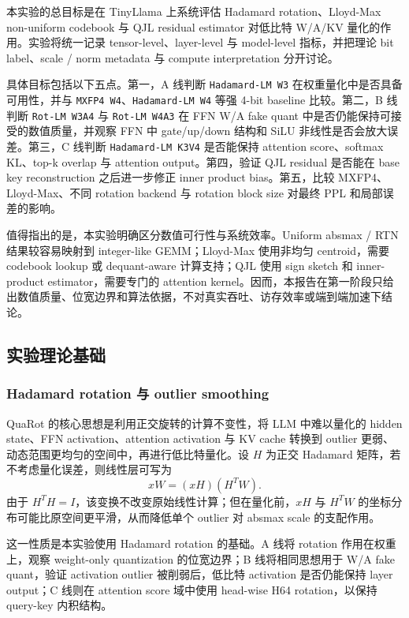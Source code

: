 \documentclass[lang=cn,chinesefont=nofont,a4paper,newtx]{elegantpaper}
\begin{document}
本实验的总目标是在 TinyLlama 上系统评估 Hadamard rotation、Lloyd-Max non-uniform codebook 与 QJL residual estimator 对低比特 W/A/KV 量化的作用。实验将统一记录 tensor-level、layer-level 与 model-level 指标，并把理论 bit label、scale / norm metadata 与 compute interpretation 分开讨论。

具体目标包括以下五点。第一，A 线判断 \texttt{Hadamard-LM W3} 在权重量化中是否具备可用性，并与 \texttt{MXFP4 W4}、\texttt{Hadamard-LM W4} 等强 4-bit baseline 比较。第二，B 线判断 \texttt{Rot-LM W3A4} 与 \texttt{Rot-LM W4A3} 在 FFN W/A fake quant 中是否仍能保持可接受的数值质量，并观察 FFN 中 gate/up/down 结构和 SiLU 非线性是否会放大误差。第三，C 线判断 \texttt{Hadamard-LM K3V4} 是否能保持 attention score、softmax KL、top-k overlap 与 attention output。第四，验证 QJL residual 是否能在 base key reconstruction 之后进一步修正 inner product bias。第五，比较 MXFP4、Lloyd-Max、不同 rotation backend 与 rotation block size 对最终 PPL 和局部误差的影响。

值得指出的是，本实验明确区分数值可行性与系统效率。Uniform absmax / RTN 结果较容易映射到 integer-like GEMM；Lloyd-Max 使用非均匀 centroid，需要 codebook lookup 或 dequant-aware 计算支持；QJL 使用 sign sketch 和 inner-product estimator，需要专门的 attention kernel。因而，本报告在第一阶段只给出数值质量、位宽边界和算法依据，不对真实吞吐、访存效率或端到端加速下结论。

\subsection{实验理论基础}

\subsubsection{Hadamard rotation 与 outlier smoothing}

QuaRot 的核心思想是利用正交旋转的计算不变性，将 LLM 中难以量化的 hidden state、FFN activation、attention activation 与 KV cache 转换到 outlier 更弱、动态范围更均匀的空间中，再进行低比特量化\cite{quarot2024}。设 $H$ 为正交 Hadamard 矩阵，若不考虑量化误差，则线性层可写为
\begin{equation}
  xW = (xH)(H^{T}W).
\end{equation}
由于 $H^{T}H=I$，该变换不改变原始线性计算；但在量化前，$xH$ 与 $H^{T}W$ 的坐标分布可能比原空间更平滑，从而降低单个 outlier 对 absmax scale 的支配作用。

这一性质是本实验使用 Hadamard rotation 的基础。A 线将 rotation 作用在权重上，观察 weight-only quantization 的位宽边界；B 线将相同思想用于 W/A fake quant，验证 activation outlier 被削弱后，低比特 activation 是否仍能保持 layer output；C 线则在 attention score 域中使用 head-wise H64 rotation，以保持 query-key 内积结构。
\end{document}
